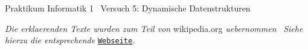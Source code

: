 Praktikum Informatik 1~\newline
Versuch 5\+: Dynamische Datenstrukturen

{\itshape Die erklaerenden Texte wurden zum Teil von} wikipedia.\+org {\itshape uebernommen}~\newline
{\itshape Siehe hierzu die entsprechende} \href{https://en.wikipedia.org/wiki/Stack_(abstract_data_type)}{\tt Webseite}. 